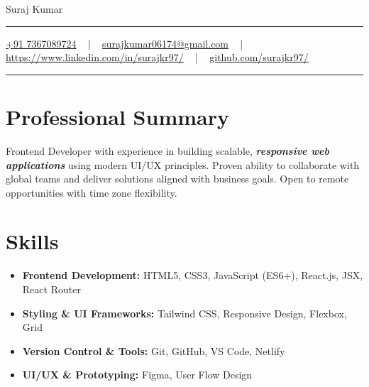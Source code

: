 \documentclass[letterpaper,10pt]{article}
\newcommand{\documentTitle}[2]{
  \begin{center}
    {\Huge\color{accentTitle} #1}
    \vspace{10pt}
    {\color{accentLine} \hrule}
    \vspace{2pt}
    \footnotesize{#2}
    \vspace{2pt}
    {\color{accentLine} \hrule}
  \end{center}
}
\begin{document}
\documentTitle{Suraj Kumar}{
    \href{tel:+917367089724}{
      \raisebox{-0.05\height}{\faPhone} +91 7367089724} ~ | ~
    \href{mailto:surajkumar06174@gmail.com}{
      \raisebox{-0.15\height}{\faEnvelope} surajkumar06174@gmail.com} ~ | ~
    \href{https://www.linkedin.com/in/surajkr97/}{
      \raisebox{-0.15\height}{\faLinkedin} https://www.linkedin.com/in/surajkr97/} ~ | ~
    \href{https://github.com/surajkr97}{
      \raisebox{-0.15\height}{\faGithub} github.com/surajkr97/}
}

  \section{Professional Summary}
  Frontend Developer with experience in building scalable, \textbf{\textit{responsive web applications}} using modern UI/UX principles. Proven ability to collaborate with global teams and deliver solutions aligned with business goals. Open to remote opportunities with time zone flexibility.




\section{Skills}
\begin{multicols}{2}
  \begin{itemize}[itemsep=2pt, parsep=1pt, leftmargin=15pt]
    \item \textbf{Frontend Development:} HTML5, CSS3, JavaScript (ES6+), React.js, JSX, React Router
    \item \textbf{Styling \& UI Frameworks:} Tailwind CSS, Responsive Design, Flexbox, Grid
    \item \textbf{Version Control \& Tools:} Git, GitHub, VS Code, Netlify
    \item \textbf{UI/UX \& Prototyping:} Figma, User Flow Design
  \end{itemize}
\end{multicols}
\end{document}
